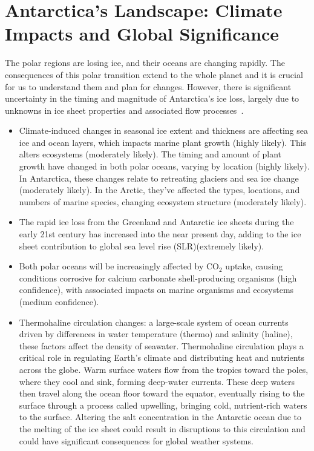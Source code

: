 \chapter{Antarctica's Landscape: Climate Impacts and Global Significance}\label{why}

The polar regions are losing ice, and their oceans are changing rapidly\cite{O_C_in_changingClimate}. The consequences of this polar transition extend to the whole planet and it is crucial for us to understand them and plan for changes. However, there is significant uncertainty in the timing and magnitude of Antarctica's ice loss, largely due to unknowns in ice sheet properties and associated flow processes~\cite{IPCC}.

\begin{itemize}
\item Climate-induced changes in seasonal ice extent and thickness are affecting sea ice and ocean layers, which impacts marine plant growth (highly likely). This alters ecosystems (moderately likely). The timing and amount of plant growth have changed in both polar oceans, varying by location (highly likely). In Antarctica, these changes relate to retreating glaciers and sea ice change (moderately likely). In the Arctic, they've affected the types, locations, and numbers of marine species, changing ecosystem structure (moderately likely)\cite{O_C_in_changingClimate}.
\item The rapid ice loss from the Greenland and Antarctic ice sheets during the early 21st century has increased into the near present day, adding to the ice sheet contribution to global sea level rise (SLR)(extremely likely)\cite{O_C_in_changingClimate}.
\item Both polar oceans will be increasingly affected by $\mathrm{CO_2}$ uptake, causing conditions corrosive for calcium carbonate shell-producing organisms (high confidence), with associated impacts on marine organisms and ecosystems (medium confidence)\cite{O_C_in_changingClimate}.
\item Thermohaline circulation changes: a large-scale system of ocean currents driven by differences in water temperature (thermo) and salinity (haline), these factors affect the density of seawater. Thermohaline circulation plays a critical role in regulating Earth's climate and distributing heat and nutrients across the globe. Warm surface waters flow from the tropics toward the poles, where they cool and sink, forming deep-water currents. These deep waters then travel along the ocean floor toward the equator, eventually rising to the surface through a process called upwelling, bringing cold, nutrient-rich waters to the surface\cite{JACOBS_2004}. Altering the salt concentration in the Antarctic ocean due to the melting of the ice sheet could result in disruptions to this circulation and could have significant consequences for global weather systems.
\end{itemize}


